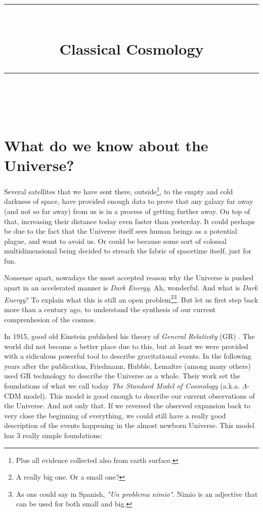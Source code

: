 \documentclass[11pt, a4paper]{article} %
\title{	
	\normalfont\normalsize
	\textsc{}\\ %
	\vspace{5pt} %
	\rule{\linewidth}{0.2pt}\\ %
	\vspace{10pt} %
	{\huge Classical Cosmology}\\ %
	\vspace{5pt} %
	\rule{\linewidth}{-2pt}\\ %
	\vspace{-25pt} %
	\date{}
}
\author{}
\begin{document}
\maketitle 



\section*{What do we know about the Universe?}

Several satellites that we have sent there, outside\footnote{Plus all evidence collected also from earth surface.}, to the empty and cold darkness of space, have provided enough data to prove that any galaxy far away (and not so far away) from us is in a process of getting further away. On top of that, increasing their distance today even faster than yesterday. It could perhaps be due to the fact that the Universe itself sees human beings as a potential plague, and want to avoid us. Or could be because some sort of colossal multidimensional being decided to streach the fabric of spacetime itself, just for fun.

Nonsense apart, nowadays the most accepted reason why the Universe is pushed apart in an accelerated manner is \textit{Dark Energy}. Ah, wonderful. And what is \textit{Dark Energy}? To explain what this is still an open problem\footnote{A really big one. Or a small one?}\footnote{As one could say in Spanish, \textit{"Un problema nimio"}. Nimio is an adjective that can be used for both small and big.}. But let us first step back more than a century ago, to understand the synthesis of our current comprenhesion of the cosmos.


In 1915, good old Einstein published his theory of \textit{General Relativity} (GR) \cite{einstein1915feldgleichungen}. The world did not become a better place due to this, but at least we were provided with a ridiculous powerful tool to describe gravitational events. In the following years after the publication, Friedmann, Hubble, Lema\^itre \cite{friedmann1922krummung,hubble1929relation,lemaitre1927univers} (among many others) used GR technology to describe the Universe as a whole. Their work set the foundations of what we call today \textit{The Standard Model of Cosmology} (a.k.a. $\Lambda$-CDM model). This model is good enough to describe our current observations of the Universe. And not only that. If we reversed the observed expansion back to very close the beginning of everything, we could still have a really good description of the events happening in the almost newborn Universe. This model has 3 really simple foundations:
\end{document}
